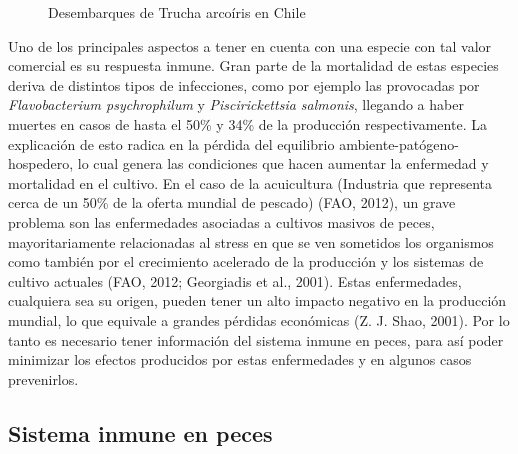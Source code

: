 \documentclass[12pt,a4paper,]{article}
\begin{document}
\begin{figure}[h]
\caption{Desembarques de Trucha arcoíris en Chile} \label{desembarques}
\end{figure}

Uno de los principales aspectos a tener en cuenta con una especie con
tal valor comercial es su respuesta inmune. Gran parte de la mortalidad
de estas especies deriva de distintos tipos de infecciones, como por
ejemplo las provocadas por \emph{Flavobacterium psychrophilum} y
\emph{Piscirickettsia salmonis}, llegando a haber muertes en casos de
hasta el 50\% y 34\% de la producción respectivamente. La explicación de
esto radica en la pérdida del equilibrio ambiente-patógeno-hospedero, lo
cual genera las condiciones que hacen aumentar la enfermedad y
mortalidad en el cultivo. En el caso de la acuicultura (Industria que
representa cerca de un 50\% de la oferta mundial de pescado) (FAO,
2012), un grave problema son las enfermedades asociadas a cultivos
masivos de peces, mayoritariamente relacionadas al stress en que se ven
sometidos los organismos como también por el crecimiento acelerado de la
producción y los sistemas de cultivo actuales (FAO, 2012; Georgiadis et
al., 2001)⁠⁠. Estas enfermedades, cualquiera sea su origen, pueden tener
un alto impacto negativo en la producción mundial, lo que equivale a
grandes pérdidas económicas (Z. J. Shao, 2001)⁠. Por lo tanto es
necesario tener información del sistema inmune en peces, para así poder
minimizar los efectos producidos por estas enfermedades y en algunos
casos prevenirlos.

\subsection{Sistema inmune en peces}\label{sistema-inmune-en-peces}
\end{document}
